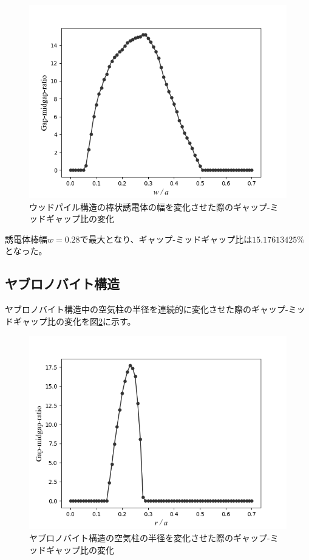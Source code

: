 \documentclass[platex,dvipdfmx]{jsreport}
\numberwithin{equation}{section}
\begin{document}
\begin{figure}[htbp]
  \centering
  \includegraphics[width=0.8\linewidth]{results/woodpile.png}
  \caption{ウッドパイル構造の棒状誘電体の幅を変化させた際のギャップ-ミッドギャップ比の変化}
  \label{fig:woodpile}
\end{figure}

誘電体棒幅$w = 0.28$で最大となり、ギャップ-ミッドギャップ比は$15.17613425 \%$となった。

\subsection{ヤブロノバイト構造}
ヤブロノバイト構造中の空気柱の半径を連続的に変化させた際のギャップ-ミッドギャップ比の変化を図\ref{fig:yablonovite}に示す。
\begin{figure}[htbp]
  \centering
  \includegraphics[width=0.8\linewidth]{results/yablonovite.png}
  \caption{ヤブロノバイト構造の空気柱の半径を変化させた際のギャップ-ミッドギャップ比の変化}
  \label{fig:yablonovite}
\end{figure}
\end{document}
